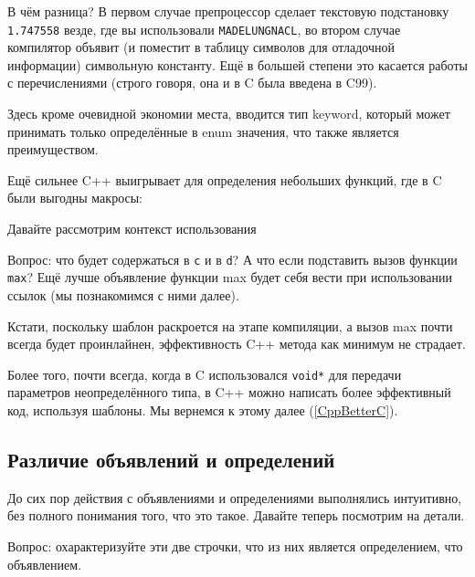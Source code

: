 \documentclass[a4paper,12pt,oneside]{article}
\begin{document}


В чём разница? В первом случае препроцессор сделает текстовую подстановку \lstinline!1.747558! везде, где вы использовали \lstinline!MADELUNGNACL!, во втором случае компилятор объявит (и поместит в таблицу символов для отладочной информации) символьную константу. Ещё в большей степени это касается работы с перечислениями (строго говоря, она и в C была введена в C99).



Здесь кроме очевидной экономии места, вводится тип keyword, который может принимать только определённые в enum значения, что также является преимуществом.

Ещё сильнее C++ выигрывает для определения небольших функций, где в C были выгодны макросы:



Давайте рассмотрим контекст использования



Вопрос: что будет содержаться в \lstinline!c! и в \lstinline!d!? А что если подставить вызов функции \lstinline!max!? Ещё лучше объявление функции max будет себя вести при использовании ссылок (мы познакомимся с ними далее).

Кстати, поскольку шаблон раскроется на этапе компиляции, а вызов max почти всегда будет проинлайнен, эффективность C++ метода как минимум не страдает.

Более того, почти всегда, когда в C использовался \lstinline!void*! для передачи параметров неопределённого типа, в C++ можно написать более эффективный код, используя шаблоны. Мы вернемся к этому далее (\ref{CppBetterC}).

\subsection{Различие объявлений и определений}

До сих пор действия с объявлениями и определениями выполнялись интуитивно, без полного понимания того, что это такое. Давайте теперь посмотрим на детали.

Вопрос: охарактеризуйте эти две строчки, что из них является определением, что объявлением.


\end{document}
